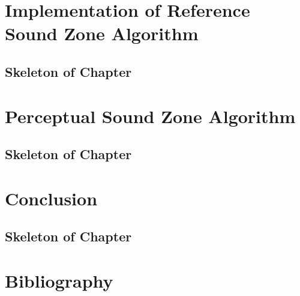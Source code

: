 \documentclass[11pt,twoside,openright,titlepage]{ce}
\begin{document}
\chapter{Implementation of Reference Sound Zone Algorithm}
\label{sec:sound_zones}
\begin{tcolorbox}
\section*{Skeleton of Chapter}

\end{tcolorbox}
\newpage

\newpage

\newpage

\newpage

\newpage


\chapter{Perceptual Sound Zone Algorithm}
\label{sec:perceptual_sound_zones}
\begin{tcolorbox}
\section*{Skeleton of Chapter}

\end{tcolorbox}
\newpage


\chapter{Conclusion}
\begin{tcolorbox}
\section*{Skeleton of Chapter}
\newpage

\end{tcolorbox}

\chapter{Bibliography}



\appendix
\end{document}
